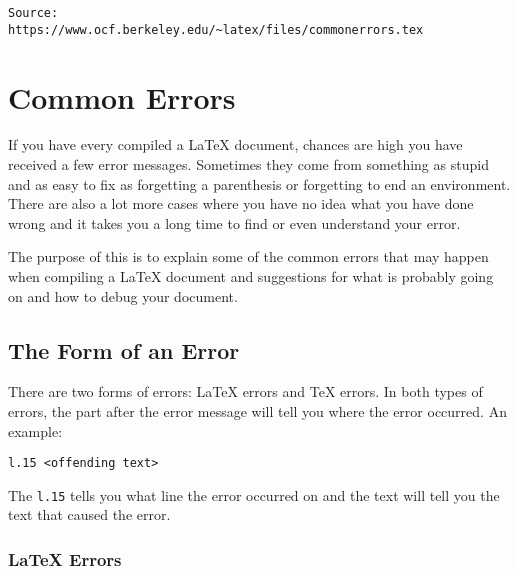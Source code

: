 \documentclass[class=article , crop=false, titlepage, twoside, multi={itemize, figure, verbatim}, float=false]{standalone}
\title{}  %
\begin{document}
\ifstandalone
\maketitle %
\tableofcontents %
\clearpage
\fi


\begin{verbatim}
Source:
https://www.ocf.berkeley.edu/~latex/files/commonerrors.tex
\end{verbatim}
\chapter{Common Errors}
\label{cha:common-errors}

If you have every compiled a \LaTeX{} document, chances are high you
have received a few error messages.  Sometimes they come from
something as stupid and as easy to fix as forgetting a parenthesis or
forgetting to end an environment.  There are also a lot more cases
where you have no idea what you have done wrong and it takes you a
long time to find or even understand your error.

The purpose of this is to explain some of the common errors that may
happen when compiling a \LaTeX{} document and suggestions for what is
probably going on and how to debug your document.

\section{The Form of an Error}
\label{sec:form-an-error}

There are two forms of errors: \LaTeX{} errors and \TeX{} errors.  In
both types of errors, the part after the error message will tell you
where the error occurred.  An example:
\begin{verbatim}
l.15 <offending text>
\end{verbatim}
The \texttt{l.15} tells you what line the error occurred on and the
text will tell you the text that caused the error.

\subsection{\LaTeX{} Errors}
\label{sec:latex-errors}
\end{document}

